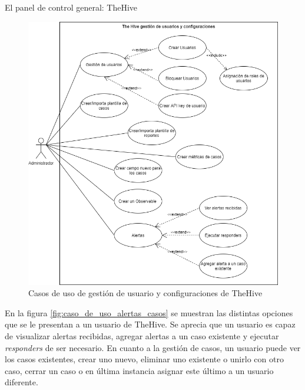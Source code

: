 \begin{section}{El panel de control general: TheHive }
     \begin{figure}[H]
        \centering
        \includegraphics[width=1\textwidth]{./descripcion_sonion_imagenes/figura_28_thehive_user_conf.png}
        \caption{Casos de uso de gestión de usuario y configuraciones de TheHive}
        \label{fig:caso_de_uso_gestion_usuario_conf_thehive}
     \end{figure}
     \FloatBarrier
     En la figura \ref{fig:caso_de_uso_alertas_casos} se muestran las distintas opciones que se le presentan a un usuario de TheHive. Se aprecia que un usuario es capaz de visualizar alertas recibidas, agregar alertas a un caso existente y ejecutar \textit{responders} de ser necesario. En cuanto a la gestión de casos, un usuario puede ver los casos existentes, crear uno nuevo, eliminar uno existente o unirlo con otro caso, cerrar un caso o en última instancia asignar este último a un usuario diferente. 
     \begin{figure}[H]
        \centering

\end{figure}
\end{section}
